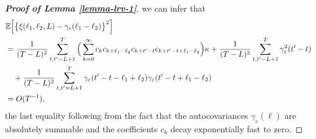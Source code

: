 \begin{proof}[\textnormal{\textbf{Proof of Lemma \ref{lemma-lrv-1}}}]
we can infer that
\begin{align*} 
 & \mathbb{E} \Big[ \big\{ \xi(\ell_1,\ell_2,L) - \gamma_\varepsilon(\ell_1-\ell_2) \big\}^2 \Big] \\
 & = \frac{1}{(T-L)^2} \sum\limits_{t,t^\prime=L+1}^T \Big( \sum_{k=0}^{\infty} c_k c_{k+\ell_1-\ell_2} c_{k+t^\prime-t} c_{k+t^\prime-t+\ell_1-\ell_2} \Big) \kappa + \frac{1}{(T-L)^2} \sum\limits_{t,t^\prime=L+1}^T \gamma_\varepsilon^2(t^\prime-t) \\
 & \quad + \frac{1}{(T-L)^2} \sum\limits_{t,t^\prime=L+1}^T  \gamma_\varepsilon(t^\prime-t-\ell_1+\ell_2) \gamma_\varepsilon(t^\prime-t+\ell_1-\ell_2) \\
 & = O(T^{-1}),
\end{align*} 
the last equality following from the fact that the autocovariances $\gamma_\varepsilon(\ell)$ are absolutely summable and the coefficients $c_k$ decay exponentially fast to zero. 
\end{proof}


